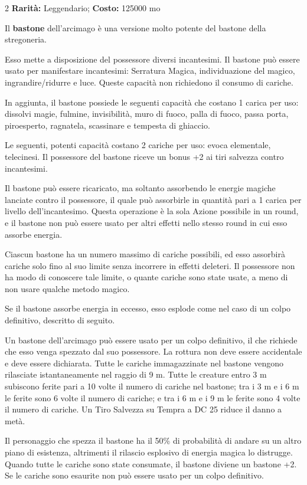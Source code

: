 \begin{multicols}{2}
\textbf{Rarità:} Leggendario; \textbf{Costo:} 125000 mo

Il \textbf{bastone} dell'arcimago è una versione molto potente del bastone della stregoneria.

Esso mette a disposizione del possessore diversi incantesimi. Il bastone può essere usato per manifestare incantesimi: Serratura Magica, individuazione del magico, ingrandire/ridurre e luce. Queste capacità non richiedono il consumo di cariche.

In aggiunta, il bastone possiede le seguenti capacità che costano 1 carica per uso: dissolvi magie, fulmine, invisibilità, muro di fuoco, palla di fuoco, passa porta, piroesperto, ragnatela, scassinare e tempesta di ghiaccio.

Le seguenti, potenti capacità costano 2 cariche per uso: evoca elementale, telecinesi. Il possessore del bastone riceve un bonus +2 ai tiri salvezza contro incantesimi.

Il bastone può essere ricaricato, ma soltanto assorbendo le energie magiche lanciate contro il possessore, il quale può assorbirle in quantità pari a 1 carica per livello dell'incantesimo. Questa operazione è la sola Azione possibile in un round, e il bastone non può essere usato per altri effetti nello stesso round in cui esso assorbe energia.

Ciascun bastone ha un numero massimo di cariche possibili, ed esso assorbirà cariche solo fino al suo limite senza incorrere in effetti deleteri. Il possessore non ha modo di conoscere tale limite, o quante cariche sono state usate, a meno di non usare qualche metodo magico.

Se il bastone assorbe energia in eccesso, esso esplode come nel caso di un colpo definitivo, descritto di seguito.

Un bastone dell'arcimago può essere usato per un colpo definitivo, il che richiede che esso venga spezzato dal suo possessore. La rottura non deve essere accidentale e deve essere dichiarata. Tutte le cariche immagazzinate nel bastone vengono rilasciate istantaneamente nel raggio di 9 m. Tutte le creature entro 3 m subiscono ferite pari a 10 volte il numero di cariche nel bastone; tra i 3 m e i 6 m le ferite sono 6 volte il numero di cariche; e tra i 6 m e i 9 m le ferite sono 4 volte il numero di cariche. Un Tiro Salvezza su Tempra a DC 25 riduce il danno a metà.

Il personaggio che spezza il bastone ha il 50\% di probabilità di andare su un altro piano di esistenza, altrimenti il rilascio esplosivo di energia magica lo distrugge. Quando tutte le cariche sono state consumate, il bastone diviene un bastone +2. Se le cariche sono esaurite non può essere usato per un colpo definitivo.


\end{multicols}
